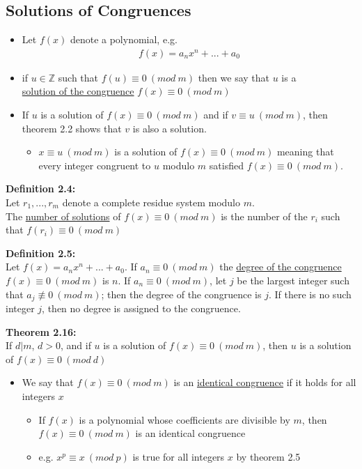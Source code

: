 \documentclass[a4paper]{article}
\begin{document}
\subsection{Solutions of Congruences}
\begin{itemize}
    \item Let $f(x)$ denote a polynomial, e.g.
    \begin{align}
        f(x)=a_nx^n+...+a_0
    \end{align}
    \item if $u\in\mathbb{Z}$ such that $f(u)\equiv0\ (mod\ m)$ then we say that $u$ is a\\ \underline{solution of the congruence} $f(x)\equiv0\ (mod\ m)$
    \item If $u$ is a solution of $f(x)\equiv0\ (mod\ m)$ and if $v\equiv u\ (mod\ m)$, then theorem 2.2 shows that $v$ is also a solution.
    \begin{itemize}
        \item $x\equiv u\ (mod\ m)$ is a solution of $f(x)\equiv0\ (mod\ m)$ meaning that every integer congruent to $u$ modulo $m$ satisfied $f(x)\equiv0\ (mod\ m)$.
    \end{itemize}
\end{itemize}

\textbf{Definition 2.4:}\\
Let $r_1,...,r_m$ denote a complete residue system modulo $m$.\\
The \underline{number of solutions} of $f(x)\equiv0\ (mod\ m)$ is the number of the $r_i$ such that $f(r_i)\equiv0\ (mod\ m)$


\textbf{Definition 2.5:}\\
Let $f(x)=a_nx^n+...+a_0$. If $a_n\equiv0\ (mod\ m)$ the \underline{degree of the congruence} $f(x)\equiv0\ (mod\ m)$ is $n$. If $a_n\equiv0\ (mod\ m)$, let $j$ be the largest integer such that $a_j\not\equiv0\ (mod\ m)$; then the degree of the congruence is $j$. If there is no such integer $j$, then no degree is assigned to the congruence.

\textbf{Theorem 2.16:}\\
If $d|m$, $d>0$, and if $u$ is a solution of $f(x)\equiv0\ (mod\ m)$, then $u$ is a solution of $f(x)\equiv0\ (mod\ d)$
\begin{itemize}
    \item We say that $f(x)\equiv0\ (mod\ m)$ is an \underline{identical congruence} if it holds for all integers $x$
    \begin{itemize}
        \item If $f(x)$ is a polynomial whose coefficients are divisible by $m$, then $f(x)\equiv0\ (mod\ m)$ is an identical congruence
        \item e.g. $x^p\equiv x\ (mod\ p)$ is true for all integers $x$ by theorem 2.5
    \end{itemize}
\end{itemize}
\end{document}
